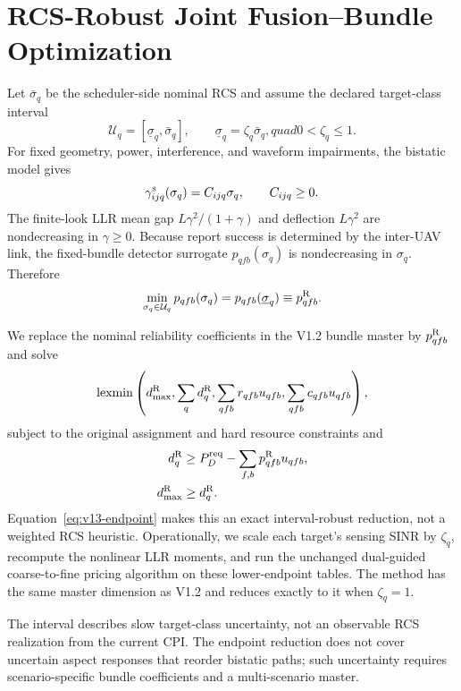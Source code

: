 \section{RCS-Robust Joint Fusion--Bundle Optimization}
\label{sec:v13-rcs-robust}

Let $\bar\sigma_q$ be the scheduler-side nominal RCS and assume the declared
target-class interval
\begin{equation}
\mathcal U_q=[\underline\sigma_q,\bar\sigma_q],\qquad
\underline\sigma_q=\zeta_q\bar\sigma_q,quad 0<\zeta_q\leq1.
\end{equation}
For fixed geometry, power, interference, and waveform impairments, the
bistatic model gives
\begin{equation}
\gamma^{\rm s}_{ijq}(\sigma_q)=C_{ijq}\sigma_q,
\qquad C_{ijq}\geq0.
\end{equation}
The finite-look LLR mean gap
$L\gamma^2/(1+\gamma)$ and deflection $L\gamma^2$ are nondecreasing in
$\gamma\geq0$.  Because report success is determined by the inter-UAV link,
the fixed-bundle detector surrogate $p_{qfb}(\sigma_q)$ is nondecreasing in
$\sigma_q$.  Therefore
\begin{equation}
\min_{\sigma_q\in\mathcal U_q}p_{qfb}(\sigma_q)
=p_{qfb}(\underline\sigma_q)\equiv p^{\rm R}_{qfb}.
\label{eq:v13-endpoint}
\end{equation}

We replace the nominal reliability coefficients in the V1.2 bundle master by
$p^{\rm R}_{qfb}$ and solve
\begin{equation}
\operatorname{lexmin}\left(d^{\rm R}_{\max},\sum_qd^{\rm R}_q,
\sum_{qfb}r_{qfb}u_{qfb},\sum_{qfb}c_{qfb}u_{qfb}\right),
\end{equation}
subject to the original assignment and hard resource constraints and
\begin{align}
d^{\rm R}_q&\geq P_D^{\rm req}-\sum_{f,b}p^{\rm R}_{qfb}u_{qfb},\\
d^{\rm R}_{\max}&\geq d^{\rm R}_q.
\end{align}
Equation~\eqref{eq:v13-endpoint} makes this an exact interval-robust reduction,
not a weighted RCS heuristic.  Operationally, we scale each target's sensing
SINR by $\zeta_q$, recompute the nonlinear LLR moments, and run the unchanged
dual-guided coarse-to-fine pricing algorithm on these lower-endpoint tables.
The method has the same master dimension as V1.2 and reduces exactly to it when
$\zeta_q=1$.

The interval describes slow target-class uncertainty, not an observable RCS
realization from the current CPI.  The endpoint reduction does not cover uncertain
aspect responses that reorder bistatic paths; such uncertainty requires
scenario-specific bundle coefficients and a multi-scenario master.
